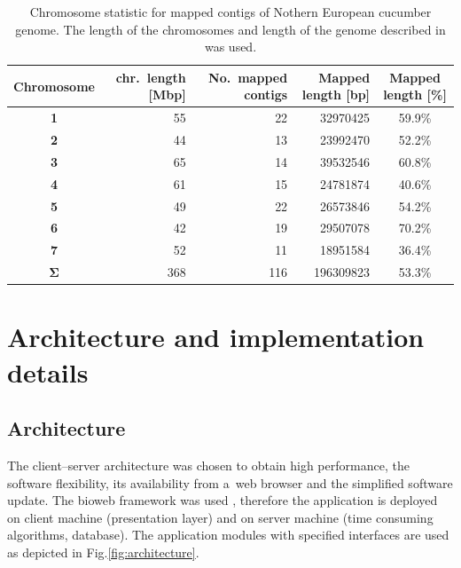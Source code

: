 \documentclass[]{spie}
\begin{document}
\begin{table}
	\centering
	\begin{tabular}{|c||r|r|r|c|} \hline
	  \textbf{Chromosome}    & chr.\ length [Mbp] & No.\ mapped contigs & Mapped length [bp] & Mapped length [\%] \\
      \hline
      \textbf{1}             & 55                 &  22                 &  32970425          & 59.9\%               \\
      \textbf{2}             & 44                 &  13                 &  23992470          & 52.2\%               \\
      \textbf{3}             & 65                 &  14                 &  39532546          & 60.8\%               \\
      \textbf{4}             & 61                 &  15                 &  24781874          & 40.6\%               \\
      \textbf{5}             & 49                 &  22                 &  26573846          & 54.2\%               \\
      \textbf{6}             & 42                 &  19                 &  29507078          & 70.2\%               \\
      \textbf{7}             & 52                 &  11                 &  18951584          & 36.4\%               \\
      \hline
      $\mathbf{\Sigma}$      &368                 & 116                 & 196309823          &  53.3\%              \\
      \hline
	\end{tabular}
	\caption{Chromosome statistic for mapped contigs of Nothern European cucumber genome.
      The length of the chromosomes and length of the genome described in \cite{chen1998reevaluation} was used.}
	\label{tab:genome_stat}
\end{table}

\section{Architecture and implementation details}

\subsection{Architecture}

The client--server architecture was chosen to obtain high performance, the software flexibility,
its availability from a~web browser and the simplified software update.
The bioweb framework was used \cite{rn:bmri2014biosoftarch},
therefore the application is deployed on client machine (presentation layer) and on server machine (time consuming algorithms, database).
The application modules with specified interfaces are used as depicted in Fig.\ref{fig:architecture}.
\end{document}
